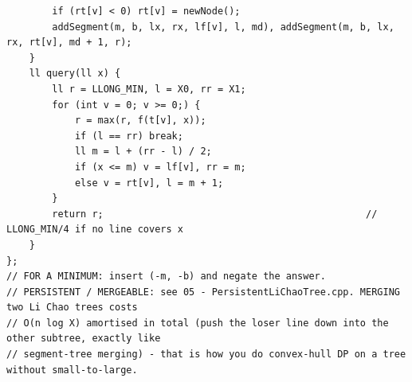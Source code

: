 \documentclass[9pt,a4paper,twocolumn]{extarticle}
\begin{document}
\begin{lstlisting}
        if (rt[v] < 0) rt[v] = newNode();
        addSegment(m, b, lx, rx, lf[v], l, md), addSegment(m, b, lx, rx, rt[v], md + 1, r);
    }
    ll query(ll x) {
        ll r = LLONG_MIN, l = X0, rr = X1;
        for (int v = 0; v >= 0;) {
            r = max(r, f(t[v], x));
            if (l == rr) break;
            ll m = l + (rr - l) / 2;
            if (x <= m) v = lf[v], rr = m;
            else v = rt[v], l = m + 1;
        }
        return r;                                              // LLONG_MIN/4 if no line covers x
    }
};
// FOR A MINIMUM: insert (-m, -b) and negate the answer.
// PERSISTENT / MERGEABLE: see 05 - PersistentLiChaoTree.cpp. MERGING two Li Chao trees costs
// O(n log X) amortised in total (push the loser line down into the other subtree, exactly like
// segment-tree merging) - that is how you do convex-hull DP on a tree without small-to-large.
\end{lstlisting}

\filbreak
\end{document}
